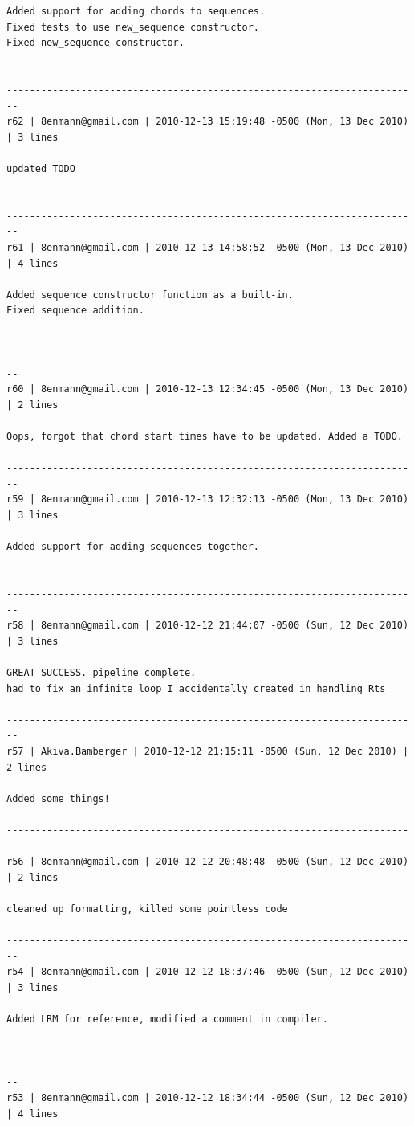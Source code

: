 \documentclass[12pt,A4]{book}
\begin{document}
\begin{verbatim}
Added support for adding chords to sequences.
Fixed tests to use new_sequence constructor.
Fixed new_sequence constructor.


------------------------------------------------------------------------
r62 | 8enmann@gmail.com | 2010-12-13 15:19:48 -0500 (Mon, 13 Dec 2010) | 3 lines

updated TODO


------------------------------------------------------------------------
r61 | 8enmann@gmail.com | 2010-12-13 14:58:52 -0500 (Mon, 13 Dec 2010) | 4 lines

Added sequence constructor function as a built-in.
Fixed sequence addition.


------------------------------------------------------------------------
r60 | 8enmann@gmail.com | 2010-12-13 12:34:45 -0500 (Mon, 13 Dec 2010) | 2 lines

Oops, forgot that chord start times have to be updated. Added a TODO.

------------------------------------------------------------------------
r59 | 8enmann@gmail.com | 2010-12-13 12:32:13 -0500 (Mon, 13 Dec 2010) | 3 lines

Added support for adding sequences together.


------------------------------------------------------------------------
r58 | 8enmann@gmail.com | 2010-12-12 21:44:07 -0500 (Sun, 12 Dec 2010) | 3 lines

GREAT SUCCESS. pipeline complete.
had to fix an infinite loop I accidentally created in handling Rts

------------------------------------------------------------------------
r57 | Akiva.Bamberger | 2010-12-12 21:15:11 -0500 (Sun, 12 Dec 2010) | 2 lines

Added some things!

------------------------------------------------------------------------
r56 | 8enmann@gmail.com | 2010-12-12 20:48:48 -0500 (Sun, 12 Dec 2010) | 2 lines

cleaned up formatting, killed some pointless code

------------------------------------------------------------------------
r54 | 8enmann@gmail.com | 2010-12-12 18:37:46 -0500 (Sun, 12 Dec 2010) | 3 lines

Added LRM for reference, modified a comment in compiler.


------------------------------------------------------------------------
r53 | 8enmann@gmail.com | 2010-12-12 18:34:44 -0500 (Sun, 12 Dec 2010) | 4 lines


\end{verbatim}
\end{document}
